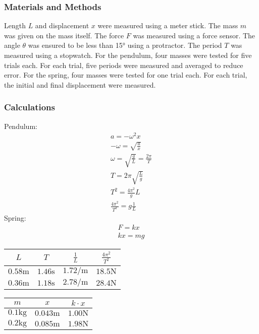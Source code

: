 \documentclass[10pt]{beamer}
\begin{document}
\begin{frame}
    \frametitle{Materials and Methods}
    Length $L$ and displacement $x$ were measured using a meter stick. The mass
    $m$ was given on the mass itself. The force $F$ was measured using a force
    sensor. The angle $\theta$ was ensured to be less than \ang{15} using a
    protractor. The period $T$ was measured using a stopwatch. For the
    pendulum, four masses were tested for five trials each. For each trial,
    five periods were measured and averaged to reduce error. For the spring,
    four masses were tested for one trial each. For each trial, the initial and
    final displacement were measured.
\end{frame}

\begin{frame}
    \frametitle{Calculations}
    \begin{minipage}{0.35\textwidth}
        Pendulum:
        \begin{gather}
            a = -\omega^2x \\
            -\omega = \sqrt{\frac{a}{x}} \\
            \omega = \sqrt{\frac{g}{L}} = \frac{2\pi}{T} \\
            T = 2\pi\sqrt{\frac{L}{g}} \\
            T^2 = \frac{4\pi^2}{g}L \\
            \frac{4\pi^2}{T^2} = g\frac{1}{L}
        \end{gather}
        Spring:
        \begin{gather}
            F = kx \\
            kx = mg 
        \end{gather}
    \end{minipage}%
    \hspace{0.04\textwidth}%
    \begin{minipage}{0.6\textwidth}
        \centering
        \begin{tabular}{c|c|c|c}
            \toprule
            $L$ & $T$ & $\frac{1}{L}$ & $\frac{4\pi^2}{T^2}$ \\
            \midrule
            $0.58\si{\meter}$ & $1.46\si{\second}$ & $1.72\si{\per\meter}$ & $18.5\si{\newton}$ \\
            $0.36\si{\meter}$ & $1.18\si{\second}$ & $2.78\si{\per\meter}$ & $28.4\si{\newton}$ \\
        \end{tabular}
        \vspace{1cm}
        \begin{tabular}{c|c|c}
            \toprule
            $m$ & $x$ & $k \cdot x$ \\
            \midrule
            $0.1\si{\kilogram}$ & $0.043\si{\meter}$ & $1.00\si{\newton}$ \\
            $0.2\si{\kilogram}$ & $0.085\si{\meter}$ & $1.98\si{\newton}$ \\
        \end{tabular}
    \end{minipage}
\end{frame}
\end{document}
